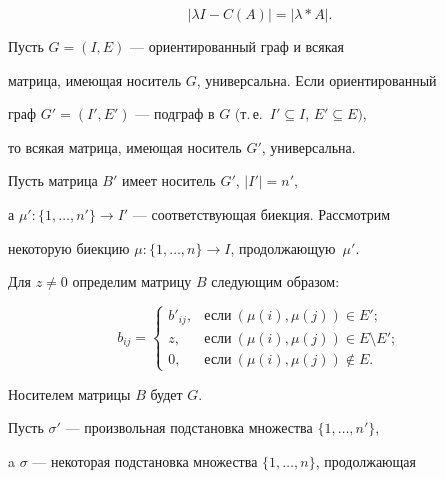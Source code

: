 \begin{pf}
$$ 


|\lambda I-C(A)|=|\lambda\ast A|. 


$$ 


 


\begin{lemnonum} 


Пусть $G=(I,E)$ --- ориентированный граф и всякая 


матрица, имеющая носитель $G$, универсальна. Если ориентированный  


граф $G'=(I',E')$ --- подграф в $G$ $($т.\,е.\ $I'\subseteq I$, $E'\subseteq 


E)$, 


то всякая матрица, имеющая носитель $G'$, универсальна. 


\end{lemnonum} 


 


\begin{pf} 


Пусть матрица $B'$ имеет носитель $G'$, $|I'|=n'$,  


а $\mu':\{1,\dotsc,n'\}\to I'$ --- соответствующая биекция. Рассмотрим 


некоторую биекцию $\mu:\{1,\dotsc,n\}\to I$, продолжающую~$\mu'$. 


 


Для $z\ne0$ определим матрицу $B$ следующим образом: 


$$ 


b_{ij}= 


\begin{cases} 


b'_{ij}, & \text{если}\ (\mu(i),\mu(j))\in E';\\ 


z, & \text{если}\ (\mu(i),\mu(j))\in E\setminus E';\\ 


0,  & \text{если}\ (\mu(i),\mu(j))\notin E. 


\end{cases} 


$$ 


Носителем матрицы $B$ будет $G$. 


 


Пусть $\sigma'$ --- произвольная подстановка множества $\{1,\dotsc,n'\}$, 


a $\sigma$ --- некоторая подстановка множества $\{1,\dotsc,n\}$, продолжающая 



\end{pf}
\end{pf}

